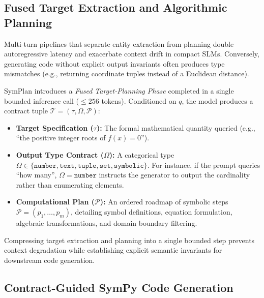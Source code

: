 \documentclass[conference,a4paper]{IEEEtran}
\begin{document}
\subsection{Fused Target Extraction and Algorithmic Planning}
\label{sec:fused_planning}

Multi-turn pipelines that separate entity extraction from planning double autoregressive latency and exacerbate context drift in compact SLMs. Conversely, generating code without explicit output invariants often produces type mismatches (e.g., returning coordinate tuples instead of a Euclidean distance).

SymPlan introduces a \textit{Fused Target-Planning Phase} completed in a single bounded inference call ($\le 256$ tokens). Conditioned on $q$, the model produces a contract tuple $\mathcal{T} = (\tau, \Omega, \mathcal{P})$:
\begin{itemize}
    \item \textbf{Target Specification ($\tau$):} The formal mathematical quantity queried (e.g., ``the positive integer roots of $f(x)=0$'').
    \item \textbf{Output Type Contract ($\Omega$):} A categorical type $\Omega \in \{\texttt{number}, \texttt{text}, \texttt{tuple}, \texttt{set}, \texttt{symbolic}\}$. For instance, if the prompt queries ``how many'', $\Omega = \texttt{number}$ instructs the generator to output the cardinality rather than enumerating elements.
    \item \textbf{Computational Plan ($\mathcal{P}$):} An ordered roadmap of symbolic steps $\mathcal{P} = (p_1, \ldots, p_m)$, detailing symbol definitions, equation formulation, algebraic transformations, and domain boundary filtering.
\end{itemize}
Compressing target extraction and planning into a single bounded step prevents context degradation while establishing explicit semantic invariants for downstream code generation.

\subsection{Contract-Guided SymPy Code Generation}
\label{sec:codegen}
\end{document}
